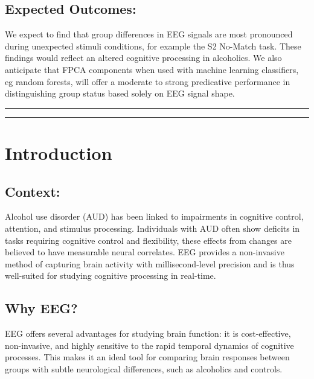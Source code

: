\documentclass{article}
\begin{document}
\subsection{Expected Outcomes:}\label{expected-outcomes}

We expect to find that group differences in EEG signals are most
pronounced during unexpected stimuli conditions, for example the S2
No-Match task. These findings would reflect an altered cognitive
processing in alcoholics. We also anticipate that FPCA components when
used with machine learning classifiers, eg random forests, will offer a
moderate to strong predicative performance in distinguishing group
status based solely on EEG signal shape.

\begin{center}\rule{0.5\linewidth}{0.5pt}\end{center}

\tableofcontents
\newpage

\begin{center}\rule{0.5\linewidth}{0.5pt}\end{center}

\section{Introduction}\label{introduction}

\subsection{Context:}\label{context}

Alcohol use disorder (AUD) has been linked to impairments in cognitive
control, attention, and stimulus processing. Individuals with AUD often
show deficits in tasks requiring cognitive control and flexibility,
these effects from changes are believed to have measurable neural
correlates. EEG provides a non-invasive method of capturing brain
activity with millisecond-level precision and is thus well-suited for
studying cognitive processing in real-time.

\subsection{Why EEG?}\label{why-eeg}

EEG offers several advantages for studying brain function: it is
cost-effective, non-invasive, and highly sensitive to the rapid temporal
dynamics of cognitive processes. This makes it an ideal tool for
comparing brain responses between groups with subtle neurological
differences, such as alcoholics and controls.
\end{document}
